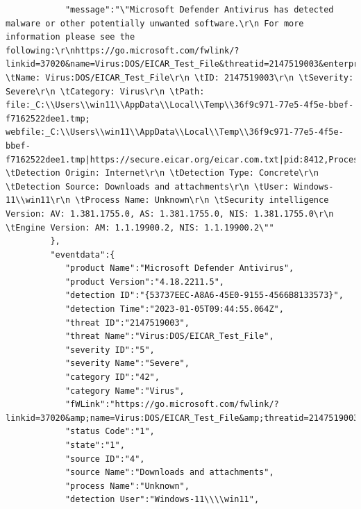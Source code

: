 \begin{itemize}
\begin{verbatim}
            "message":"\"Microsoft Defender Antivirus has detected malware or other potentially unwanted software.\r\n For more information please see the following:\r\nhttps://go.microsoft.com/fwlink/?linkid=37020&name=Virus:DOS/EICAR_Test_File&threatid=2147519003&enterprise=0\r\n \tName: Virus:DOS/EICAR_Test_File\r\n \tID: 2147519003\r\n \tSeverity: Severe\r\n \tCategory: Virus\r\n \tPath: file:_C:\\Users\\win11\\AppData\\Local\\Temp\\36f9c971-77e5-4f5e-bbef-f7162522dee1.tmp; webfile:_C:\\Users\\win11\\AppData\\Local\\Temp\\36f9c971-77e5-4f5e-bbef-f7162522dee1.tmp|https://secure.eicar.org/eicar.com.txt|pid:8412,ProcessStart:133173854939240064\r\n \tDetection Origin: Internet\r\n \tDetection Type: Concrete\r\n \tDetection Source: Downloads and attachments\r\n \tUser: Windows-11\\win11\r\n \tProcess Name: Unknown\r\n \tSecurity intelligence Version: AV: 1.381.1755.0, AS: 1.381.1755.0, NIS: 1.381.1755.0\r\n \tEngine Version: AM: 1.1.19900.2, NIS: 1.1.19900.2\""
         },
         "eventdata":{
            "product Name":"Microsoft Defender Antivirus",
            "product Version":"4.18.2211.5",
            "detection ID":"{53737EEC-A8A6-45E0-9155-4566B8133573}",
            "detection Time":"2023-01-05T09:44:55.064Z",
            "threat ID":"2147519003",
            "threat Name":"Virus:DOS/EICAR_Test_File",
            "severity ID":"5",
            "severity Name":"Severe",
            "category ID":"42",
            "category Name":"Virus",
            "fWLink":"https://go.microsoft.com/fwlink/?linkid=37020&amp;name=Virus:DOS/EICAR_Test_File&amp;threatid=2147519003&amp;enterprise=0",
            "status Code":"1",
            "state":"1",
            "source ID":"4",
            "source Name":"Downloads and attachments",
            "process Name":"Unknown",
            "detection User":"Windows-11\\\\win11",

\end{verbatim}
\end{itemize}
